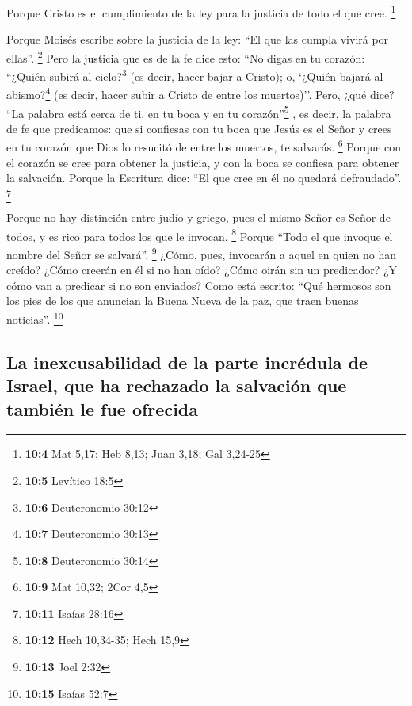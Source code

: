  Porque Cristo es el cumplimiento de la ley para la
justicia de todo el que cree. \footnote{\textbf{10:4} Mat 5,17; Heb
  8,13; Juan 3,18; Gal 3,24-25}

 Porque Moisés escribe sobre la justicia de la ley: ``El
que las cumpla vivirá por ellas''. \footnote{\textbf{10:5} Levítico 18:5}
 Pero la justicia que es de la fe dice esto: ``No digas en
tu corazón: ``¿Quién subirá al cielo?\footnote{\textbf{10:6}
  Deuteronomio 30:12} (es decir, hacer bajar a Cristo); 
o, `¿Quién bajará al abismo?\footnote{\textbf{10:7} Deuteronomio 30:13}
(es decir, hacer subir a Cristo de entre los muertos)''. 
Pero, ¿qué dice? ``La palabra está cerca de ti, en tu boca y en tu
corazón''\footnote{\textbf{10:8} Deuteronomio 30:14} , es decir, la
palabra de fe que predicamos:  que si confiesas con tu
boca que Jesús es el Señor y crees en tu corazón que Dios lo resucitó de
entre los muertos, te salvarás. \footnote{\textbf{10:9} Mat 10,32; 2Cor
  4,5}  Porque con el corazón se cree para obtener la
justicia, y con la boca se confiesa para obtener la salvación.
 Porque la Escritura dice: ``El que cree en él no quedará
defraudado''. \footnote{\textbf{10:11} Isaías 28:16}

 Porque no hay distinción entre judío y griego, pues el
mismo Señor es Señor de todos, y es rico para todos los que le invocan.
\footnote{\textbf{10:12} Hech 10,34-35; Hech 15,9} 
Porque ``Todo el que invoque el nombre del Señor se salvará''.
\footnote{\textbf{10:13} Joel 2:32}  ¿Cómo, pues,
invocarán a aquel en quien no han creído? ¿Cómo creerán en él si no han
oído? ¿Cómo oirán sin un predicador?  ¿Y cómo van a
predicar si no son enviados? Como está escrito: ``Qué hermosos son los
pies de los que anuncian la Buena Nueva de la paz, que traen buenas
noticias''. \footnote{\textbf{10:15} Isaías 52:7}

\hypertarget{la-inexcusabilidad-de-la-parte-incruxe9dula-de-israel-que-ha-rechazado-la-salvaciuxf3n-que-tambiuxe9n-le-fue-ofrecida}{%
\subsection{La inexcusabilidad de la parte incrédula de Israel, que ha
rechazado la salvación que también le fue
ofrecida}\label{la-inexcusabilidad-de-la-parte-incruxe9dula-de-israel-que-ha-rechazado-la-salvaciuxf3n-que-tambiuxe9n-le-fue-ofrecida}}

